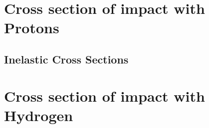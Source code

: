 
\clearpage
\section{Cross section of  impact with  Protons}
\subsection{Inelastic Cross Sections}












\clearpage

\section{Cross section of  impact with  Hydrogen}






